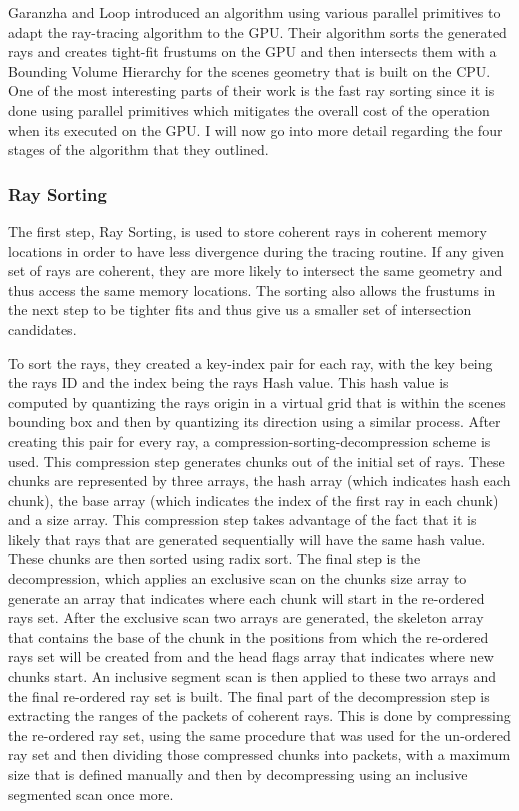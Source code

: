 Garanzha and Loop \cite{Garanzha10} introduced an algorithm using various parallel primitives to adapt the ray-tracing algorithm to the GPU. Their algorithm sorts the generated rays and creates tight-fit frustums on the GPU and then intersects them with a Bounding Volume Hierarchy for the scenes geometry that is built on the CPU. One of the most interesting parts of their work is the fast ray sorting since it is done using parallel primitives which mitigates the overall cost of the operation when its executed on the GPU. I will now go into more detail regarding the four stages of the algorithm that they outlined.

\medskip

\subsubsection{Ray Sorting}

The first step, Ray Sorting, is used to store coherent rays in coherent memory locations in order to have less divergence during the tracing routine. If any given set of rays are coherent, they are more likely to intersect the same geometry and thus access the same memory locations. The sorting also allows the frustums in the next step to be tighter fits and thus give us a smaller set of intersection candidates.

\medskip

To sort the rays, they created a key-index pair for each ray, with the key being the rays ID and the index being the rays Hash value. This hash value is computed by quantizing the rays origin in a virtual grid that is within the scenes bounding box and then by quantizing its direction using a similar process.
After creating this pair for every ray, a compression-sorting-decompression scheme is used. This compression step generates chunks out of the initial set of rays. These chunks are represented by three arrays, the hash array (which indicates hash each chunk), the base array (which indicates the index of the first ray in each chunk) and a size array. This compression step takes advantage of the fact that it is likely that rays that are generated sequentially will have the same hash value. These chunks are then sorted using radix sort. The final step is the decompression, which applies an exclusive scan on the chunks size array to generate an array that indicates where each chunk will start in the re-ordered rays set.
After the exclusive scan two arrays are generated, the skeleton array that contains the base of the chunk in the positions from which the re-ordered rays set will be created from and the head flags array that indicates where new chunks start. An inclusive segment scan is then applied to these two arrays and the final re-ordered ray set is built. The final part of the decompression step is extracting the ranges of the packets of coherent rays. This is done by compressing the re-ordered ray set, using the same procedure that was used for the un-ordered ray set and then dividing those compressed chunks into packets, with a maximum size that is defined manually and then by decompressing using an inclusive segmented scan once more.

